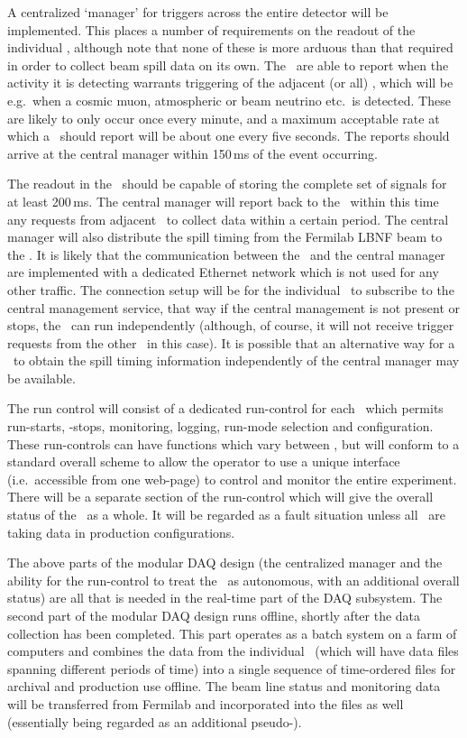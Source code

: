 A centralized `manager' for triggers across the entire detector will
be implemented.  This places a number of requirements on the readout
of the individual \COMPARTMENTS, although note that none of these is
more arduous than that required in order to collect beam spill data on
its own.  The \COMPARTMENTS\ are able to report when the activity it is
detecting warrants triggering of the adjacent (or all) \COMPARTMENTS,
which will be e.g.\ when a cosmic muon, atmospheric or beam neutrino
etc.\ is detected.  These are likely to only occur once every minute,
and a maximum acceptable rate at which a \COMPARTMENT\ should report
will be about one every five seconds.  The reports should arrive at
the central manager within 150\,ms of the event occurring.

The readout in the \COMPARTMENTS\ should be capable of storing the
complete set of signals for at least 200\,ms.  The central manager
will report back to the \COMPARTMENTS\ within this time any requests
from adjacent \COMPARTMENTS\ to collect data within a certain period.
The central manager will also distribute the spill timing from the
Fermilab LBNF beam to the \COMPARTMENTS.  It is likely that the
communication between the \COMPARTMENTS\ and the central manager are
implemented with a dedicated Ethernet network which is not used for any
other traffic.  The connection setup
will be for the individual \COMPARTMENT\ to subscribe to the central
management service, that way if the central management is not present
or stops, the \COMPARTMENT\ can run independently (although, of course,
it will not receive trigger requests from the other \COMPARTMENTS\ in
this case).  It is possible that an alternative way for a \COMPARTMENT\
to obtain the spill timing information independently of the central
manager may be available.

The run control will consist of a dedicated run-control for each
\COMPARTMENT\ which permits run-starts, -stops, monitoring, logging,
run-mode selection and configuration.  These run-controls can have
functions which vary between \COMPARTMENTS, but will conform to a
standard overall scheme to allow the operator to use a unique
interface (i.e.\ accessible from one web-page) to control and monitor
the entire experiment.  There will be a separate section of the
run-control which will give the overall status of the \COMPARTMENTS\ as
a whole.  It will be regarded as a fault situation unless all
\COMPARTMENTS\ are taking data in production configurations. 

The above parts of the modular DAQ design (the centralized manager and
the ability for the run-control to treat the \COMPARTMENTS\ as
autonomous, with an additional overall status) are all that is needed
in the real-time part of the DAQ subsystem.  The second part of the
modular DAQ design runs offline, shortly after the data collection has been
completed.  This part operates as a batch system on a farm of
computers and combines the data from the individual \COMPARTMENTS\
(which will have data files spanning different periods of time) into
a single sequence of time-ordered files for archival and production
use offline.  The beam line status and monitoring data will be
transferred from Fermilab and incorporated into the files as well
(essentially being regarded as an additional pseudo-\COMPARTMENT).
